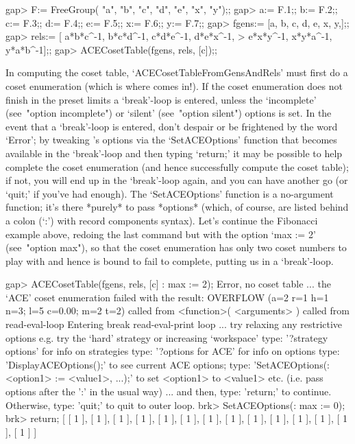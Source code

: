 \beginexample
gap> F:= FreeGroup( "a", "b", "c", "d", "e", "x", "y");;
gap> a:= F.1;; b:= F.2;; c:= F.3;; d:= F.4;; e:= F.5;; x:= F.6;; y:= F.7;;
gap> fgens:= [a, b, c, d, e, x, y,];;
gap> rels:= [ a*b*c^-1, b*c*d^-1, c*d*e^-1, d*e*x^-1,
>             e*x*y^-1, x*y*a^-1, y*a*b^-1];;
gap> ACECosetTable(fgens, rels, [c]);;
\endexample

In computing  the  coset  table,  `ACECosetTableFromGensAndRels'  must
first do a coset enumeration (which is where {\ACE} comes in!). If the
coset enumeration does not finish in the preset limits a  `break'-loop
is entered,  unless  the  `incomplete'  (see~"option  incomplete")  or
`silent' (see~"option silent") options is set. In  the  event  that  a
`break'-loop is entered, don't despair or be frightened  by  the  word
`Error'; by tweaking {\ACE}'s options via the `SetACEOptions' function
that becomes available in the `break'-loop and then  typing  `return;'
it may be possible to help {\ACE} complete the coset enumeration  (and
hence successfully compute the coset table); if not, you will  end  up
in the `break'-loop again, and you can have another go (or `quit;'  if
you've had enough). The  `SetACEOptions'  function  is  a  no-argument
function; it's there *purely* to pass *options* (which, of course, are
listed behind a colon (`:')  with  record  components  syntax).  Let's
continue the Fibonacci example above, redoing  the  last  command  but
with the option `max := 2'  (see~"option  max"),  so  that  the  coset
enumeration has only two coset numbers to play with and hence is bound
to fail to complete, putting us in a `break'-loop.

\beginexample
gap> ACECosetTable(fgens, rels, [c] : max := 2);
Error, no coset table ...
 the `ACE' coset enumeration failed with the result:
 OVERFLOW (a=2 r=1 h=1 n=3; l=5 c=0.00; m=2 t=2)
 called from
<function>( <arguments> ) called from read-eval-loop
Entering break read-eval-print loop ...
 try relaxing any restrictive options
 e.g. try the `hard' strategy or increasing `workspace'
 type: '?strategy options' for info on strategies
 type: '?options for ACE' for info on options
 type: 'DisplayACEOptions();' to see current ACE options;
 type: 'SetACEOptions(:<option1> := <value1>, ...);'
 to set <option1> to <value1> etc.
 (i.e. pass options after the ':' in the usual way)
 ... and then, type: 'return;' to continue.
 Otherwise, type: 'quit;' to quit to outer loop.
brk> SetACEOptions(: max := 0);
brk> return;
[ [ 1 ], [ 1 ], [ 1 ], [ 1 ], [ 1 ], [ 1 ], [ 1 ], [ 1 ], [ 1 ], [ 1 ], 
  [ 1 ], [ 1 ], [ 1 ], [ 1 ] ]
\endexample

